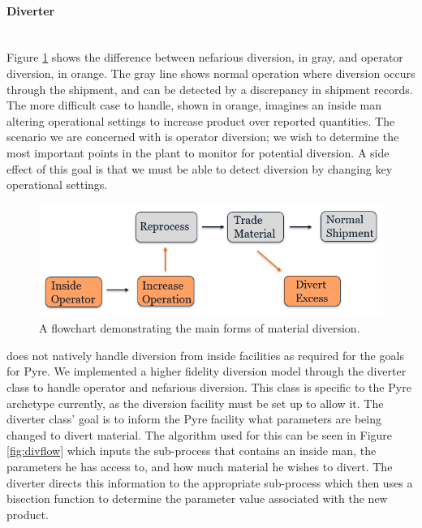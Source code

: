 \paragraph{Diverter} \mbox{}\\
Figure \ref{fig:diverttype} shows the difference between nefarious diversion, in gray, and operator diversion, in orange. The gray line shows normal operation where diversion occurs
through the shipment, and can be detected by a discrepancy in shipment records. The more difficult case to handle, shown in orange, imagines an inside man altering operational settings
to increase product over reported quantities. The scenario we are concerned with is operator diversion; we wish to determine the most important points in the plant to monitor for potential
diversion. A side effect of this goal is that we must be able to detect diversion by changing key operational settings.

\FloatBarrier

\begin{figure}[h]
	\centering
	\includegraphics[width=0.8\linewidth]{images/westphal-diversion}
	\caption{A flowchart demonstrating the main forms of material diversion.}
	\label{fig:diverttype}
\end{figure}

\Cyclus does not natively handle diversion from inside facilities as required for the goals for Pyre. We implemented a higher fidelity diversion model through the
diverter class to handle operator and nefarious diversion. This class is specific to the Pyre archetype currently, as the diversion facility must be set up to allow it.
The diverter class' goal is to inform the Pyre facility what parameters are being changed to divert material. The algorithm used for this can be seen in Figure \ref{fig:divflow}
which inputs the sub-process that contains an inside man, the parameters he has access to, and how much material he wishes to divert. The diverter directs this information to the
appropriate sub-process which then uses a bisection function to determine the parameter value associated with the new product.

\FloatBarrier

